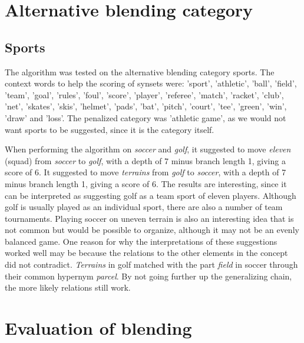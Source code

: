 
\section{Alternative blending category}
\subsection{Sports}
The algorithm was tested on the alternative blending category sports. The context words to help the scoring of synsets were: 'sport', 'athletic', 'ball', 'field', 'team', 'goal', 'rules', 'foul', 'score', 'player', 'referee', 'match', 'racket', 'club', 'net', 'skates', 'skis', 'helmet', 'pads', 'bat', 'pitch', 'court', 'tee', 'green', 'win', 'draw' and 'loss'.
The penalized category was 'athletic game', as we would not want sports to be suggested, since it is the category itself.

When performing the algorithm on \emph{soccer} and \emph{golf}, it suggested to move \emph{eleven} (squad) from \emph{soccer} to \emph{golf}, with a depth of 7 minus branch length 1, giving a score of 6. It suggested to move \emph{terrains} from \emph{golf} to \emph{soccer}, with a depth of 7 minus branch length 1, giving a score of 6. The results are interesting, since it can be interpreted as suggesting golf as a team sport of eleven players. Although golf is usually played as an individual sport, there are also a number of team tournaments. Playing soccer on uneven terrain is also an interesting idea that is not common but would be possible to organize, although it may not be an evenly balanced game. One reason for why the interpretations of these suggestions worked well may be because the relations to the other elements in the concept did not contradict. \emph{Terrains} in golf matched with the part \emph{field} in soccer through their common hypernym \emph{parcel}. By not going further up the generalizing chain, the more likely relations still work.


\section{Evaluation of blending}

